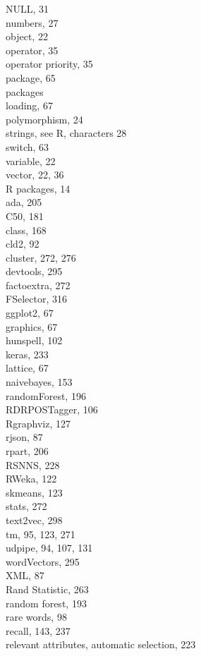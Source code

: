 \documentclass[10pt]{book}
\begin{document}
NULL, 31\\
numbers, 27\\
object, 22\\
operator, 35\\
operator priority, 35\\
package, 65\\
packages\\
loading, 67\\
polymorphism, 24\\
strings, see R, characters 28\\
switch, 63\\
variable, 22\\
vector, 22, 36\\
R packages, 14\\
ada, 205\\
C50, 181\\
class, 168\\
cld2, 92\\
cluster, 272, 276\\
devtools, 295\\
factoextra, 272\\
FSelector, 316\\
ggplot2, 67\\
graphics, 67\\
hunspell, 102\\
keras, 233\\
lattice, 67\\
naivebayes, 153\\
randomForest, 196\\
RDRPOSTagger, 106\\
Rgraphviz, 127\\
rjson, 87\\
rpart, 206\\
RSNNS, 228\\
RWeka, 122\\
skmeans, 123\\
stats, 272\\
text2vec, 298\\
tm, 95, 123, 271\\
udpipe, 94, 107, 131\\
wordVectors, 295\\
XML, 87\\
Rand Statistic, 263\\
random forest, 193\\
rare words, 98\\
recall, 143, 237\\
relevant attributes, automatic selection, 223\\
\end{document}
